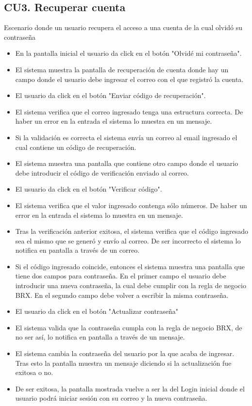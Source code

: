 \subsection{CU3. Recuperar cuenta}  \par
Escenario donde un usuario recupera el acceso a una cuenta de la cual olvidó su contraseña
\begin{itemize}
	\item En la pantalla inicial el usuario da click en el botón "Olvidé mi contraseña".
	\item El sistema muestra la pantalla de recuperación de cuenta donde hay un campo donde el usuario debe ingresar el correo con el que registró la cuenta.
	\item El usuario da click en el botón "Enviar código de recuperación".
	\item El sistema verifica que el correo ingresado tenga una estructura correcta. De haber un error en la entrada el sistema lo muestra en un mensaje.
	\item Si la validación es correcta el sistema envía un correo al email ingresado el cual contiene un código de recuperación.
	\item El sistema muestra una pantalla que contiene otro campo donde el usuario debe introducir el código de verificación enviado al correo.
	\item El usuario da click en el botón "Verificar código".
	\item El sistema verifica que el valor ingresado contenga sólo números. De haber un error en la entrada el sistema lo muestra en un mensaje.
	\item Tras la verificación anterior exitosa, el sistema verifica que el código ingresado sea el mismo que se generó y envío al correo. De ser incorrecto el sistema lo notifica en pantalla a través de un correo.
	\item Si el código ingresado coincide, entonces el sistema muestra una pantalla que tiene dos campos para contraseña. En el primer campo el usuario debe introducir una nueva contraseña, la cual debe cumplir con la regla de negocio BRX. En el segundo campo debe volver a escribir la misma contraseña.
	\item El usuario da click en el botón "Actualizar contraseña"
	\item El sistema valida que la contraseña cumpla con la regla de negocio BRX, de no ser así, lo notifica en pantalla a través de un mensaje.
	\item El sistema cambia la contraseña del usuario por la que acaba de ingresar. Tras esto la pantalla muestra un mensaje diciendo si la actualización fue exitosa o no.
	\item De ser exitosa, la pantalla mostrada vuelve a ser la del Login inicial donde el usuario podrá iniciar sesión con su correo y la nueva contraseña.
\end{itemize}
